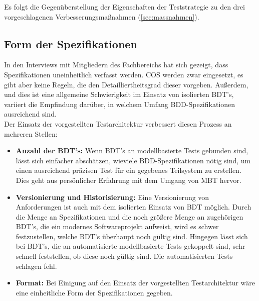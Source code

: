 Es folgt die Gegenüberstellung der Eigenschaften der Teststrategie zu den drei vorgeschlagenen Verbesserungsmaßnahmen (\ref{sec:massnahmen}).

\subsection{Form der Spezifikationen}
In den Interviews mit Mitgliedern des Fachbereichs hat sich gezeigt, dass Spezifikationen uneinheitlich verfasst werden. \Gls{COS} werden zwar eingesetzt, es gibt aber keine Regeln, die den Detailliertheitsgrad dieser vorgeben. Außerdem, und dies ist eine allgemeine Schwierigkeit im Einsatz von isolierten \Gls{BDT}'s, variiert die Empfindung darüber, in welchem Umfang \Gls{BDD}-Spezifikationen ausreichend sind.\\ Der Einsatz der vorgestellten Testarchitektur verbessert diesen Prozess an mehreren Stellen:

\begin{itemize}
\item \textbf{Anzahl der \Gls{BDT}'s:} Wenn \Gls{BDT}'s  an modellbasierte Tests gebunden sind, lässt sich einfacher abschätzen, wieviele \Gls{BDD}-Spezifikationen nötig sind, um einen ausreichend präzisen Test für ein gegebenes Teilsystem zu erstellen. Dies geht aus persönlicher Erfahrung mit dem Umgang von \Gls{MBT} hervor.
\item \textbf{Versionierung und Historisierung:} Eine Versionierung von Anforderungen ist auch mit dem isolierten Einsatz von \Gls{BDT} möglich. Durch die Menge an Spezifikationen und die noch größere Menge an zugehörigen \Gls{BDT}'s, die ein modernes Softwareprojekt aufweist, wird es schwer festzustellen, welche \Gls{BDT}'s überhaupt noch gültig sind. Hingegen lässt sich bei \Gls{BDT}'s, die an automatisierte modellbasierte Tests gekoppelt sind, sehr schnell feststellen, ob diese noch gültig sind. Die automatisierten Tests schlagen fehl.
\item \textbf{Format:} Bei Einigung auf den Einsatz der vorgestellten Testarchitektur wäre eine einheitliche Form der Spezifikationen gegeben.
\end{itemize}


